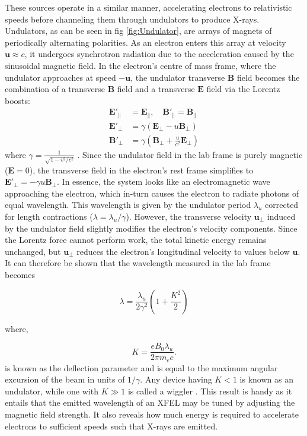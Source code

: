 \documentclass[aps,prb,twocolumn,superscriptaddress]{revtex4-2}
\begin{document}
These sources operate in a similar manner, accelerating
electrons to relativistic speeds before channeling them through undulators to
produce X-rays. Undulators, as can be seen in fig \ref{fig:Undulator}, are 
arrays of magnets of periodically alternating polarities. As an electron enters
this array at velocity $\textbf{u} \approx c$, it undergoes synchrotron 
radiation due to the acceleration caused by the sinusoidal magnetic field. In
the electron's centre of mass frame, where the undulator approaches at speed
$-\textbf{u}$, the undulator transverse $\textbf{B}$ field becomes the
combination of a transverse $\textbf{B}$ field and a transverse $\textbf{E}$
field via the Lorentz boosts:
\begin{align}
\mathbf{E}'_{\parallel} &= \mathbf{E}_{\parallel}, \quad \mathbf{B}'_{\parallel} = \mathbf{B}_{\parallel} \\
\mathbf{E}'_{\perp} &= \gamma (\mathbf{E}_{\perp} - u \mathbf{B}_{\perp}) \\
\mathbf{B}'_{\perp} &= \gamma \left( \mathbf{B}_{\perp} + \frac{u}{c^2} \mathbf{E}_{\perp} \right)
\end{align}
where $\gamma = \frac{1}{\sqrt{1 - v^2/c^2}}$ . Since the undulator field in
the lab frame is purely magnetic ($\textbf{E} = 0$), the transverse field in
the electron's rest frame simplifies to $\mathbf{E}'_{\perp} = - \gamma u
\mathbf{B}_{\perp}$. In essence, the system looks like an electromagnetic wave
approaching the electron, which in-turn causes the electron to radiate photons
of equal wavelength. This wavelength is given by the undulator period
$\lambda_u$ corrected for length contractions ($\lambda = \lambda_u/\gamma$).
However, the transverse velocity $\textbf{u}_{\perp}$ induced by the undulator
field slightly modifies the electron’s velocity components. Since the Lorentz
force cannot perform work, the total kinetic energy remains unchanged, but
$\textbf{u}_{\perp}$ reduces the electron’s longitudinal velocity to values
below $\textbf{u}$. It can therefore be shown that the wavelength measured in 
the lab frame becomes

\begin{equation}\label{equation: XFEL wl}
    \lambda = \frac{\lambda_u}{2\gamma^2}\left(1 + \frac{K^2}{2} \right)
\end{equation}

where,

\begin{equation}
    K = \frac{eB_0\lambda_u}{2\pi m_e c}.
\end{equation}
is known as the deflection parameter and is equal to the maximum angular
excursion of the beam in units of $1/\gamma$. Any device having $K < 1$ is
known as an undulator, while one with $K \gg 1$ is called a wiggler
\cite{Properties of Undulator Radiation - CERN}. This result is handy as it
entails that the emitted wavelength of an XFEL may be tuned by adjusting the
magnetic field strength. It also reveals how much 
energy is required to accelerate electrons to sufficient speeds such that 
X-rays are emitted. 
    
\end{document}
